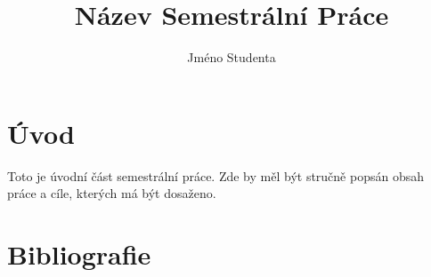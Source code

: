\documentclass{article}
\title{Název Semestrální Práce}
\author{Jméno Studenta}
\begin{document}
\maketitle

\newpage

\tableofcontents

\newpage
\section{Úvod}
Toto je úvodní část semestrální práce. Zde by měl být stručně popsán obsah práce a cíle, kterých má být dosaženo.
\cite{sample-reference}


\newpage
\section*{Bibliografie}
\printbibliography[heading=bibintoc]

\newpage
\listoffigures
\end{document}
